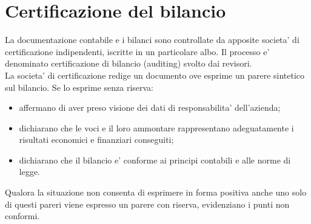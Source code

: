 \documentclass{report}
\begin{document}
	\section{Certificazione del bilancio}
	La documentazione contabile e i bilanci sono controllate da apposite societa' di certificazione indipendenti, iscritte in un particolare albo. Il processo e' denominato certificazione di bilancio (auditing) svolto dai revisori.
	\medskip \\La societa' di certificazione redige un documento ove esprime un parere sintetico sul bilancio. Se lo esprime senza riserva:
	\begin{itemize}
		\item affermano di aver preso visione dei dati di responsabilita' dell'azienda;
		\item dichiarano che le voci e il loro ammontare rappresentano adeguatamente i risultati economici e finanziari conseguiti;
		\item dichiarano che il bilancio e' conforme ai principi contabili e alle norme di legge.
	\end{itemize}
	Qualora la situazione non consenta di esprimere in forma positiva anche uno solo di questi pareri viene espresso un parere con riserva, evidenziano i punti non conformi.
	
	
	
\end{document}
